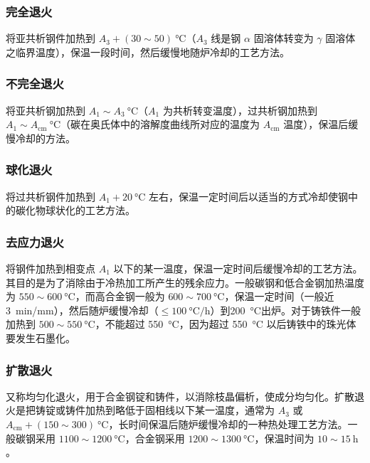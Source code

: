 \documentclass[a4paper,utf8]{article}
\begin{document}
        \subsubsection{完全退火}
            将亚共析钢件加热到 $A_3+(30\sim 50)~\unit{\degreeCelsius}$（$A_3$ 线是钢 $\alpha$ 固溶体转变为 $\gamma$ 固溶体之临界温度），保温一段时间，然后缓慢地随炉冷却的工艺方法。
        \subsubsection{不完全退火}
            将亚共析钢加热到 $A_1 \sim A_3~\unit{\degreeCelsius}$（$A_1$ 为共析转变温度），过共析钢加热到 $A_1 \sim A_{\textrm{cm}}~\unit{\degreeCelsius}$（碳在奥氏体中的溶解度曲线所对应的温度为 $A_{\textrm{cm}}$ 温度），保温后缓慢冷却的方法。
        \subsubsection{球化退火}
            将过共析钢件加热到 $A_1+20~\unit{\degreeCelsius}$ 左右，保温一定时间后以适当的方式冷却使钢中的碳化物球状化的工艺方法。
        \subsubsection{去应力退火}
            将钢件加热到相变点 $A_1$ 以下的某一温度，保温一定时间后缓慢冷却的工艺方法。其目的是为了消除由于冷热加工所产生的残余应力。一般碳钢和低合金钢加热温度为 $550 \sim 600~\unit{\degreeCelsius}$，而高合金钢一般为 $600 \sim 700~\unit{\degreeCelsius}$，保温一定时间（一般近 \SI{3}{\minute/\milli\metre}），然后随炉缓慢冷却（$\le \SI{100}{\degreeCelsius/\hour}$）到\SI{200}{\degreeCelsius}出炉。对于铸铁件一般加热到 $500 \sim 550~\unit{\degreeCelsius}$，不能超过 \SI{550}{\degreeCelsius}，因为超过 \SI{550}{\degreeCelsius} 以后铸铁中的珠光体要发生石墨化。
        \subsubsection{扩散退火}
            又称均匀化退火，用于合金钢锭和铸件，以消除枝晶偏析，使成分均匀化。扩散退火是把铸锭或铸件加热到略低于固相线以下某一温度，通常为 $A_3$ 或 $A_{\textrm{cm}} + (150 \sim 300)~\unit{\degreeCelsius}$，长时间保温后随炉缓慢冷却的一种热处理工艺方法。一般碳钢采用 $1100 \sim 1200~\unit{\degreeCelsius}$，合金钢采用 $1200 \sim 1300~\unit{\degreeCelsius}$，保温时间为 $10 \sim 15~\unit{\hour}$。
\end{document}

